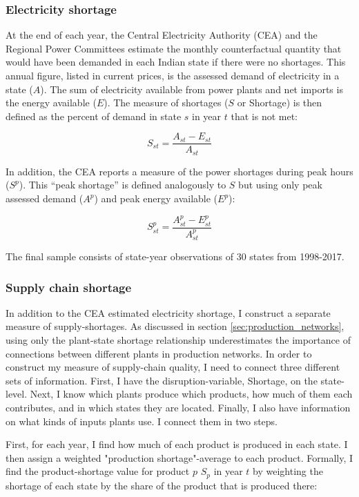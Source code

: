 \documentclass[11pt]{article}
\begin{document}
\subsubsection{Electricity shortage}%
\label{sub:shortage}

At the end of each year, the Central Electricity Authority (CEA) and the Regional Power Committees estimate the monthly counterfactual quantity that would have been demanded in each Indian state if there were no shortages. This annual figure, listed in current prices, is the assessed demand of electricity in a state (\(A\)). The sum of electricity available from power plants and net imports is the energy available ($E$). The measure of shortages (\(S\) or Shortage) is then defined as the percent of demand in state \(s\) in year \(t\) that is not met:

\[
S_{st} = \frac{A_{st} - E_{st} }{A_{st}}
\]

In addition, the CEA reports a measure of the power shortages during peak hours (\(S^p\)). This ``peak shortage'' is defined analogously to \(S\) but using only peak assessed demand (\(A^{p}\)) and peak energy available (\(E^p\)):

\[
S^{p}_{st} = \frac{A^{p}_{st} - E^{p}_{st}}{A^{p}_{st}}
\]

The final sample consists of state-year observations of 30 states from 1998-2017. 

\subsubsection{Supply chain shortage}%
\label{sub:supply_chain_quality}

In addition to the CEA estimated electricity shortage, I construct a separate measure of supply-shortages. As discussed in section \ref{sec:production_networks}, using only the plant-state shortage relationship underestimates the importance of connections between different plants in production networks. In order to construct my measure of supply-chain quality, I need to connect three different sets of information. First, I have the disruption-variable, Shortage, on the state-level. Next, I know which plants produce which products, how much of them each contributes, and in which states they are located. Finally, I also have information on what kinds of inputs plants use. I connect them in two steps.

First, for each year, I find how much of each product is produced in each state. I then assign a weighted "production shortage"-average to each product. Formally, I find the product-shortage value for product $p$ $S_{p}$ in year $t$ by weighting the shortage of each state by the share of the product that is produced there:
\end{document}

